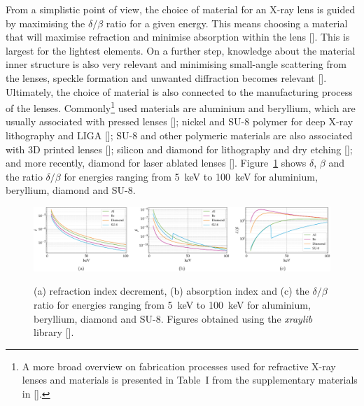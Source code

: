 \begin{refsection}
From a simplistic point of view, the choice of material for an X-ray lens is guided by maximising the $\delta/\beta$ ratio for a given energy. This means choosing a material that will maximise refraction and minimise absorption within the lens [\cite{Serebrennikov2016, Roth2017}]. This is largest for the lightest elements. On a further step, knowledge about the material inner structure is also very relevant and minimising small-angle scattering from the lenses, speckle formation and unwanted diffraction becomes relevant [\cite{Roth2014,Chubar2020,Lyatun2020}]. Ultimately, the choice of material is also connected to the manufacturing process of the lenses. Commonly\footnote{A more broad overview on fabrication processes used for refractive X-ray lenses and materials is presented in Table~I from the supplementary materials in [\cite{Roth2017}].} used materials are aluminium and beryllium, which are usually associated with pressed lenses [\cite{Lengeler1999,Lengeler2002,Schroer2002}]; nickel and SU-8 polymer for deep X-ray lithography and LIGA [\cite{Nazmov2004,Nazmov2005,Nazmov2007}]; SU-8 and other polymeric materials are also associated with 3D printed lenses [\cite{Petrov2017,Sanli2018,Barannikov2019}]; silicon and diamond for lithography and dry etching [\cite{Aristov2000,Nohammer2003,Nohammer2003b,Schroer2003}]; and more recently, diamond for laser ablated lenses [\cite{Kononenko2016,Polikarpov2016,Antipov2020,Medvedskaya2020}]. Figure~\ref{fig:refractive_index} shows $\delta$, $\beta$ and the ratio $\delta/\beta$ for energies ranging from 5~keV to 100~keV for aluminium, beryllium, diamond and SU-8. 

\begin{figure}[t]
    \centering
    {\includegraphics[width=1\linewidth]{figures/ch03/n_lens.pdf}}
    \caption[Index of refraction for common lens materials]{(a) refraction index decrement, (b) absorption index and (c) the $\delta/\beta$ ratio for energies ranging from 5~keV to 100~keV for aluminium, beryllium, diamond and SU-8. Figures obtained using the \textit{xraylib} library [\cite{Brunetti2004, Schoonjans2011}].}
    \label{fig:refractive_index}
\end{figure}


\end{refsection}
